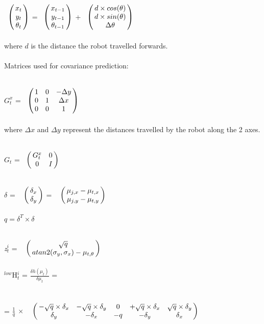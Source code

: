 \documentclass{ba-kecs}
\numberwithin{figure}{section}
\numberwithin{equation}{section}
\begin{document}
$\bordermatrix{ 	& \cr
                 &x_{t} \cr
                 &y_{t} \cr
                 &\theta_{t} \cr}$
=
$\bordermatrix{ 	& \cr
                 &x_{t-1} \cr
                 &y_{t-1} \cr
                 &\theta_{t-1} \cr}$
+
$\bordermatrix{ 	& \cr
                 &d \times cos(\theta) \cr
                 &d \times sin(\theta) \cr
                 &\Delta\theta \cr}$ \\ \\
where $d$ is the distance the robot travelled forwards. \\ \\
Matrices used for covariance prediction:

$G_t^x$ = 
$\bordermatrix{ 	& \cr
                 &1 & 0 & -\Delta y \cr
                 &0 & 1 & \Delta x \cr
                 &0 & 0 & 1 \cr}$ \\ \\
where $\Delta x$ and $\Delta y$ represent the distances travelled by the robot along the 2 axes.

$G_t$ = 
$\bordermatrix{ 	& \cr
                 &G_t^x & 0 \cr
                 &0 & I \cr}$
                 
$\delta$ = $\bordermatrix{~ \cr
                        & \delta_{x} \cr
                        & \delta_{y}}$ = $\bordermatrix{~ \cr
                                                                                                & \mu_{j,x} - \mu_{t,x} \cr
                                                                & \mu_{j,y} - \mu_{t,y} \cr}$\\ \\

$\textit{q} = \delta^{T} \times \delta$

\textit{z}$^{i}_{t}$ = $\bordermatrix{~ \cr
                        & \sqrt{q} \cr
                        & atan2(\sigma_{y},\sigma_{x}) - \mu_{t,\theta}}$\\ \\
                                          
$^{low}$H$^{i}_{t}$ = $\frac{\delta h(\mu_{t})}{\delta{\mu_{t}}}$ = \\ \\ = $\frac{1}{q}$ $\times$ $\bordermatrix{~ \cr
                                & -\sqrt{q} \times \delta_{x} & -\sqrt{q} \times \delta_{y} & 0 & +\sqrt{q} \times \delta_{x} & \sqrt{q} \times \delta_{y} \cr
                                & \delta_{y} & -\delta_{x} & -q & -\delta_{y} & \delta_{x}} $\\ \\
                                                  
\end{document}
